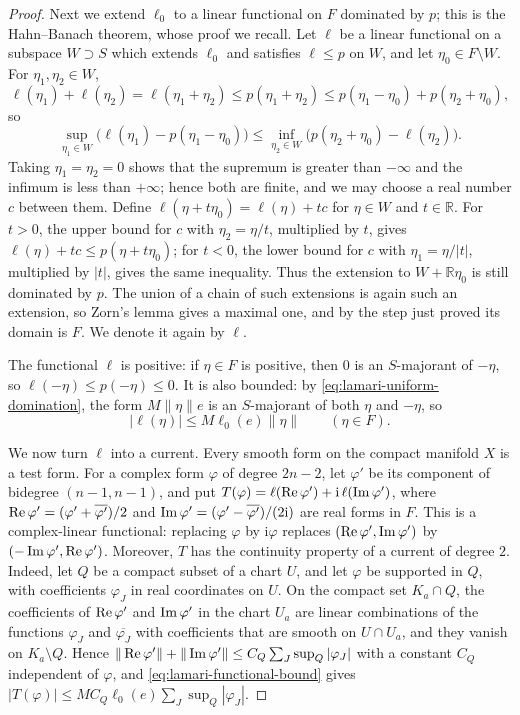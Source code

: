 \begin{proof}
Next we extend $\ell_0$ to a linear functional on $F$ dominated by $p$; this is the Hahn--Banach theorem, whose proof we recall. Let $\ell$ be a linear functional on a subspace $W\supset S$ which extends $\ell_0$ and satisfies $\ell\leq p$ on $W$, and let $\eta_0\in F\setminus W$. For $\eta_1,\eta_2\in W$,
\[
 \ell(\eta_1)+\ell(\eta_2)=\ell(\eta_1+\eta_2)\leq p(\eta_1+\eta_2)\leq p(\eta_1-\eta_0)+p(\eta_2+\eta_0),
\]
so
\[
 \sup_{\eta_1\in W}\bigl(\ell(\eta_1)-p(\eta_1-\eta_0)\bigr)
 \leq\inf_{\eta_2\in W}\bigl(p(\eta_2+\eta_0)-\ell(\eta_2)\bigr).
\]
Taking $\eta_1=\eta_2=0$ shows that the supremum is greater than $-\infty$ and the infimum is less than $+\infty$; hence both are finite, and we may choose a real number $c$ between them. Define $\ell(\eta+t\eta_0)=\ell(\eta)+tc$ for $\eta\in W$ and $t\in\mathbb R$. For $t>0$, the upper bound for $c$ with $\eta_2=\eta/t$, multiplied by $t$, gives $\ell(\eta)+tc\leq p(\eta+t\eta_0)$; for $t<0$, the lower bound for $c$ with $\eta_1=\eta/|t|$, multiplied by $|t|$, gives the same inequality. Thus the extension to $W+\mathbb R\eta_0$ is still dominated by $p$. The union of a chain of such extensions is again such an extension, so Zorn's lemma gives a maximal one, and by the step just proved its domain is $F$. We denote it again by $\ell$.

The functional $\ell$ is positive: if $\eta\in F$ is positive, then $0$ is an $S$-majorant of $-\eta$, so $\ell(-\eta)\leq p(-\eta)\leq0$. It is also bounded: by \eqref{eq:lamari-uniform-domination}, the form $M\|\eta\|e$ is an $S$-majorant of both $\eta$ and $-\eta$, so
\begin{equation}\label{eq:lamari-functional-bound}
 |\ell(\eta)|\leq M\ell_0(e)\|\eta\|\qquad(\eta\in F).
\end{equation}

We now turn $\ell$ into a current. Every smooth form on the compact manifold $X$ is a test form. For a complex form $\varphi$ of degree $2n-2$, let $\varphi'$ be its component of bidegree $(n-1,n-1)$, and put $T(\varphi)=\ell(\operatorname{Re}\varphi')+\mathrm i\,\ell(\operatorname{Im}\varphi')$, where $\operatorname{Re}\varphi'=(\varphi'+\overline{\varphi'})/2$ and $\operatorname{Im}\varphi'=(\varphi'-\overline{\varphi'})/(2\mathrm i)$ are real forms in $F$. This is a complex-linear functional: replacing $\varphi$ by $\mathrm i\varphi$ replaces $(\operatorname{Re}\varphi',\operatorname{Im}\varphi')$ by $(-\operatorname{Im}\varphi',\operatorname{Re}\varphi')$. Moreover, $T$ has the continuity property of a current of degree $2$. Indeed, let $Q$ be a compact subset of a chart $U$, and let $\varphi$ be supported in $Q$, with coefficients $\varphi_J$ in real coordinates on $U$. On the compact set $K_a\cap Q$, the coefficients of $\operatorname{Re}\varphi'$ and $\operatorname{Im}\varphi'$ in the chart $U_a$ are linear combinations of the functions $\varphi_J$ and $\overline{\varphi_J}$ with coefficients that are smooth on $U\cap U_a$, and they vanish on $K_a\setminus Q$. Hence $\|\operatorname{Re}\varphi'\|+\|\operatorname{Im}\varphi'\|\leq C_Q\sum_J\sup_Q|\varphi_J|$ with a constant $C_Q$ independent of $\varphi$, and \eqref{eq:lamari-functional-bound} gives $|T(\varphi)|\leq MC_Q\ell_0(e)\sum_J\sup_Q|\varphi_J|$.


\end{proof}
